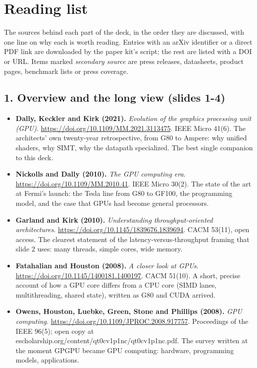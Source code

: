 \documentclass[11pt,letterpaper]{article}
\begin{document}
\section{Reading list}
\label{app:reading}
The sources behind each part of the deck, in the order they are discussed, with one line on why each is worth reading. Entries with an arXiv identifier or a direct PDF link are downloaded by the paper kit's script; the rest are listed with a DOI or URL. Items marked \emph{secondary source} are press releases, datasheets, product pages, benchmark lists or press coverage.
\subsection*{1. Overview and the long view (slides 1-4)}
\begin{itemize}[leftmargin=1.2em,itemsep=3pt]\sloppy
\item \textbf{Dally, Keckler and Kirk (2021).} \textit{Evolution of the graphics processing unit (GPU)}. \url{https://doi.org/10.1109/MM.2021.3113475}. IEEE Micro 41(6). The architects' own twenty-year retrospective, from G80 to Ampere: why unified shaders, why SIMT, why the datapath specialized. The best single companion to this deck.
\item \textbf{Nickolls and Dally (2010).} \textit{The GPU computing era}. \url{https://doi.org/10.1109/MM.2010.41}. IEEE Micro 30(2). The state of the art at Fermi's launch: the Tesla line from G80 to GF100, the programming model, and the case that GPUs had become general processors.
\item \textbf{Garland and Kirk (2010).} \textit{Understanding throughput-oriented architectures}. \url{https://doi.org/10.1145/1839676.1839694}. CACM 53(11), open access. The clearest statement of the latency-versus-throughput framing that slide 2 uses: many threads, simple cores, wide memory.
\item \textbf{Fatahalian and Houston (2008).} \textit{A closer look at GPUs}. \url{https://doi.org/10.1145/1400181.1400197}. CACM 51(10). A short, precise account of how a GPU core differs from a CPU core (SIMD lanes, multithreading, shared state), written as G80 and CUDA arrived.
\item \textbf{Owens, Houston, Luebke, Green, Stone and Phillips (2008).} \textit{GPU computing}. \url{https://doi.org/10.1109/JPROC.2008.917757}. Proceedings of the IEEE 96(5); open copy at escholarship.org/content/qt0cv1p1nc/qt0cv1p1nc.pdf. The survey written at the moment GPGPU became GPU computing: hardware, programming models, applications.

\end{itemize}
\end{document}
